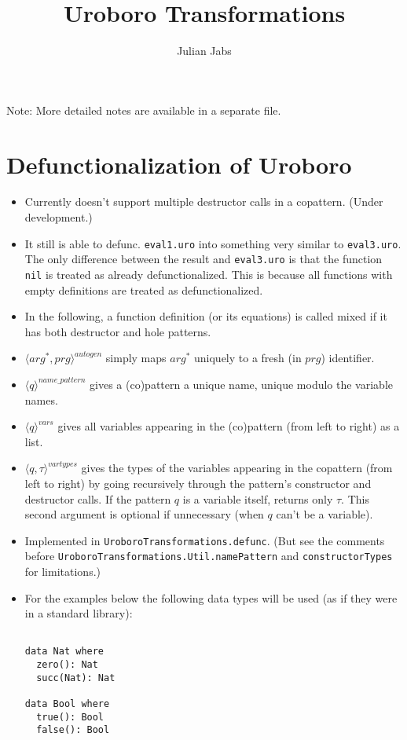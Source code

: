 \documentclass[11pt]{article} %
\title{Uroboro Transformations}
\author{Julian Jabs}
\begin{document}
\maketitle

Note: More detailed notes are available in a separate file.

\section{Defunctionalization of Uroboro}

\begin{itemize}
\item Currently doesn't support multiple destructor calls in a copattern. (Under development.)

\item It still is able to defunc. \texttt{eval1.uro} into something very similar to \texttt{eval3.uro}. The only difference between the result and \texttt{eval3.uro} is that the function \texttt{nil} is treated as already defunctionalized. This is because all functions with empty definitions are treated as defunctionalized.

\item In the following, a function definition (or its equations) is called mixed if it has both destructor and hole patterns.

\item $\langle arg^*, prg \rangle^{autogen}$ simply maps $arg^*$ uniquely to a fresh (in $prg$) identifier.

\item $\langle q \rangle^{name\_pattern}$ gives a (co)pattern a unique name, unique modulo the variable names.

\item $\langle q \rangle^{vars}$ gives all variables appearing in the (co)pattern (from left to right) as a list.

\item $\langle q, \tau \rangle^{vartypes}$ gives the types of the variables appearing in the copattern (from left to right) by going recursively through the pattern's constructor and destructor calls. If the pattern $q$ is a variable itself, returns only $\tau$. This second argument is optional if unnecessary (when $q$ can't be a variable).

\item Implemented in \texttt{UroboroTransformations.defunc}. (But see the comments before \texttt{UroboroTransformations.Util.namePattern} and \texttt{constructorTypes} for limitations.)

\item For the examples below the following data types will be used (as if they were in a standard library):
\begin{lstlisting}

data Nat where
  zero(): Nat
  succ(Nat): Nat

data Bool where
  true(): Bool
  false(): Bool

\end{lstlisting}
\end{itemize}
\end{document}
